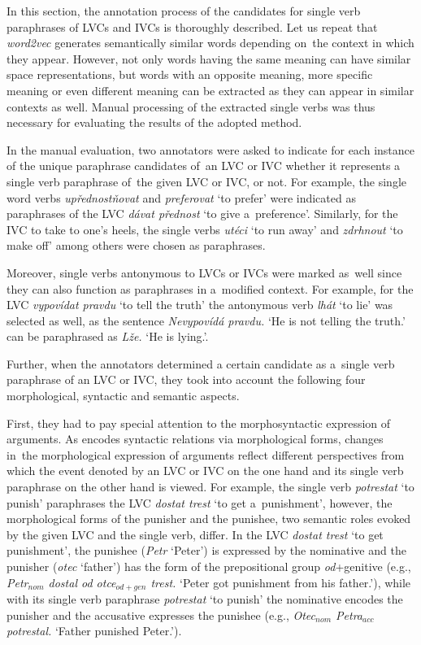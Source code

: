 \documentclass[output=paper
,modfonts
,nonflat]{langsci/langscibook}
\begin{document}
In this section, the annotation process of the candidates for single verb 
paraphrases of LVCs and IVCs is thoroughly described. Let us repeat that 
\emph{word2vec} generates semantically similar words depending on~the context 
in which they appear. However, not only words having the same meaning can have similar space representations, but words with an opposite meaning, more specific meaning or even different meaning can be extracted as they can appear in similar contexts as well. Manual processing of the extracted single verbs 
was thus necessary for evaluating the results of the adopted method.

In the manual evaluation, two annotators were asked to indicate for each 
instance of the unique paraphrase candidates of~an LVC or IVC whether it 
represents a single verb paraphrase of~the given LVC or IVC, or not. For 
example, the single word verbs \textit{upřednostňovat} and \textit{preferovat} 
`to prefer' were indicated as paraphrases of the LVC \textit{dávat přednost} 
`to give a~preference'. Similarly, for the IVC  
{to take to one's heels}, the single verbs 
\textit{utéci} `to run away' and \textit{zdrhnout} `to make off' among others 
were chosen as paraphrases.

Moreover, single verbs antonymous to LVCs or IVCs were marked as~well 
since they can also function as paraphrases in a~modified context. 
For example, for the LVC \textit{vypovídat pravdu} `to tell the truth' the 
antonymous verb \textit{lhát} `to lie' was selected as well, as the sentence  
\textit{Nevypovídá pravdu.} `He is not telling the truth.' can be paraphrased 
as \textit{Lže.} `He is lying.'.

Further, when the annotators determined a certain candidate as a~single 
verb paraphrase of an LVC or IVC, they took into account the following 
four morphological, syntactic and semantic aspects. 

First, they had to pay special attention to the morphosyntactic expression of 
arguments. As  encodes syntactic relations via morphological forms, 
changes in~the morphological expression of arguments reflect different 
perspectives from which the event denoted by an LVC or IVC on the one hand
and its single verb paraphrase on the other hand is viewed. 
For example, the single verb \textit{potrestat} `to punish' paraphrases 
the LVC \textit{dostat trest} `to get a~punishment', however, 
the morphological forms of the punisher and the punishee, two semantic roles 
evoked by the given LVC and the single verb, differ. In the LVC \textit{dostat 
trest} `to get punishment', the punishee (\textit{Petr} `Peter') is expressed 
by the nominative and the punisher (\textit{otec} `father') 
has the form of the prepositional group \textit{od}+genitive
(e.g., \textit{Petr$_{nom}$ dostal od otce$_{od+gen}$ trest.} `Peter got punishment from his father.'), while with its single verb paraphrase \textit{potrestat} `to punish'
the nominative encodes the punisher and the accusative expresses the punishee (e.g., \textit{Otec$_{nom}$ Petra$_{acc}$ potrestal.} `Father punished Peter.').
\end{document}
